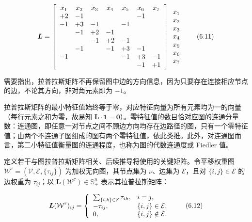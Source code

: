 \begin{equation}
\boldsymbol {L} = \left[ \begin{array}{c c c c c c c} x _ {1} & x _ {2} & x _ {3} & x _ {4} & x _ {5} & x _ {6} & x _ {7} \\ + 2 & - 1 & & & & - 1 & \\ - 1 & + 3 & - 1 & & - 1 & & \\ & - 1 & + 2 & - 1 & & & \\ & & - 1 & + 2 & - 1 & & \\ & - 1 & & - 1 & + 3 & - 1 & \\ - 1 & & & & - 1 & + 3 & - 1 \\ & & & & & - 1 & + 1 \end{array} \right] \begin{array}{c} x _ {1} \\ x _ {2} \\ x _ {3} \\ x _ {4} \\ x _ {5} \\ x _ {6} \\ x _ {7} \end{array}\tag{6.11}
\end{equation}

需要指出，拉普拉斯矩阵不再保留图中边的方向信息，因为只要存在连接相应节点的边，不论其方向，非对角元素即为 $-1$。

拉普拉斯矩阵的最小特征值始终等于零，对应特征向量为所有元素均为一的向量（每行元素之和为零，故易知 $\pmb { L } \cdot \mathbf { 1 } = \mathbf { 0 }$）。零特征值的数目恰对应图的连通分量数：连通图，即任意一对节点之间不顾边方向均存在边路径的图，只有一个零特征值；由两个不连通子图组成的图有两个零特征值，依此类推。此外，对连通图而言，第二小特征值衡量图的连通程度，也称为图的代数连通度或 Fiedler 值。

定义若干与图拉普拉斯矩阵相关、后续推导将使用的关键矩阵。令平移权重图 $\mathcal { W } ^ { \tau } = ( \mathcal { V } , \mathcal { E } , \{ \tau _ { i j } \} )$ 为加权无向图，其节点集为 $\nu$、边集为 $\mathcal { E }$，且对 $\{ i , j \} \in { \mathcal { E } }$ 的边权重为 $\tau _ { i j }$；以 $\pmb { L } ( \mathcal { W } ^ { \tau } ) \in \mathbb { S } _ { + } ^ { n }$ 表示其拉普拉斯矩阵：

\begin{equation}
\boldsymbol {L} (\mathcal {W} ^ {\tau}) _ {i j} = \left\{ \begin{array}{l l} \sum_ {\{i, k \} \in \mathcal {E}} \tau_ {i k}, & i = j, \\ - \tau_ {i j}, & \{i, j \} \in \mathcal {E}, \\ 0, & \{i, j \} \notin \mathcal {E}. \end{array} \right.\tag{6.12}
\end{equation}

